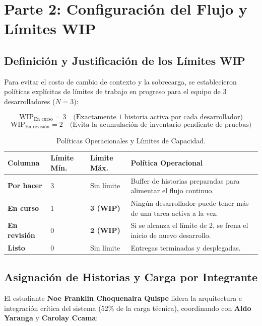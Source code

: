 \section{Parte 2: Configuración del Flujo y Límites WIP}

\subsection{Definición y Justificación de los Límites WIP}
Para evitar el costo de cambio de contexto y la sobrecarga, se establecieron políticas explícitas de límites de trabajo en progreso para el equipo de 3 desarrolladores ($N = 3$):

\begin{equation}
    \text{WIP}_{\text{En curso}} = 3 \quad \text{(Exactamente 1 historia activa por cada desarrollador)}
\end{equation}
\begin{equation}
    \text{WIP}_{\text{En revisión}} = 2 \quad \text{(Evita la acumulación de inventario pendiente de pruebas)}
\end{equation}

\begin{table}[H]
\centering
\small
\caption{Políticas Operacionales y Límites de Capacidad.}
\label{tab:wip_limits}
\begin{tabularx}{\textwidth}{P{3.0cm} P{2.0cm} P{2.2cm} Y}
\toprule
\textbf{Columna} & \textbf{Límite Mín.} & \textbf{Límite Máx.} & \textbf{Política Operacional} \\
\midrule
\textbf{Por hacer} & 3 & Sin límite & Buffer de historias preparadas para alimentar el flujo continuo. \\
\textbf{En curso} & 1 & \textbf{3 (WIP)} & Ningún desarrollador puede tener más de una tarea activa a la vez. \\
\textbf{En revisión} & 0 & \textbf{2 (WIP)} & Si se alcanza el límite de 2, se frena el inicio de nuevo desarrollo. \\
\textbf{Listo} & 0 & Sin límite & Entregas terminadas y desplegadas. \\
\bottomrule
\end{tabularx}
\end{table}

\subsection{Asignación de Historias y Carga por Integrante}
El estudiante \textbf{Noe Franklin Choquenaira Quispe} lidera la arquitectura e integración crítica del sistema (52\% de la carga técnica), coordinando con \textbf{Aldo Yaranga} y \textbf{Carolay Ccama}:

